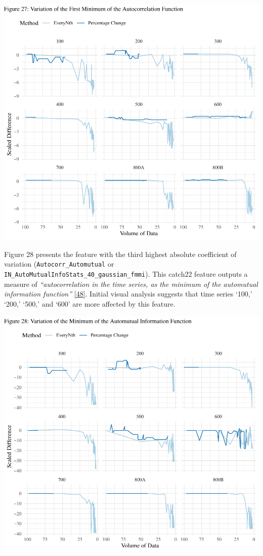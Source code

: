 \documentclass{article}
\begin{document}
\includegraphics{210431461_CSC8639_Dissertation_files/figure-latex/FirstMinimum2-1.pdf}

\newpage

Figure 28 presents the feature with the third highest absolute
coefficient of variation (\texttt{Autocorr\_Automutual} or
\texttt{IN\_AutoMutualInfoStats\_40\_gaussian\_fmmi}). This catch22
feature outputs a measure of \emph{``autocorrelation in the time series,
as the minimum of the automutual information function''}
\protect\hyperlink{ref-feature_book}{{[}48{]}}. Initial visual analysis
suggests that time series `100,' `200,' `500,' and `600' are more
affected by this feature.

\includegraphics{210431461_CSC8639_Dissertation_files/figure-latex/AutoMutalFunction-1.pdf}
\end{document}
